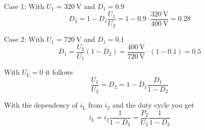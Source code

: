
\begin{solutionblock}
    Case 1: With $U_\mathrm{1}$ = $\SI{320}{\volt}$ and $D_1 = 0.9$
    \begin{equation}
        D_2 = 1 - D_1 \frac{U_\mathrm{1}}{U_\mathrm{2}} = 1 - 0.9 \cdot \frac{\SI{320}{\volt}}{\SI{400}{\volt}}= 0.28
    \end{equation}

    

    Case 2: With $U_\mathrm{1}$ = $\SI{720}{\volt}$ and $D_1 = 0.1$
    \begin{equation}
        D_1 = \frac{U_\mathrm{2}}{U_\mathrm{1}} \left(1 - D_2 \right)= \frac{\SI{400}{\volt}}{\SI{720}{\volt}} \cdot \left(1 - 0.1\right) = 0.5
    \end{equation}

        
        
\end{solutionblock}

\begin{solutionblock}
    With $U_\mathrm{L} = 0$ it follows
    \begin{equation}
        \frac{U_\mathrm{1}}{U_\mathrm{2}} = D_2 = 1 - D_1 \frac{D_1}{1-D_2}
    \end{equation}
\end{solutionblock}


\begin{solutionblock}
    With the dependency of $i_\mathrm{L}$ from $i_\mathrm{2}$ and the duty cycle you get
    \begin{equation}
        i_\mathrm{L}=i_\mathrm{2} \frac{1}{1-D_2}= \frac{P_\mathrm{2}}{U_\mathrm{2}} \frac{1}{1-D_2}
    \end{equation}
\end{solutionblock}


